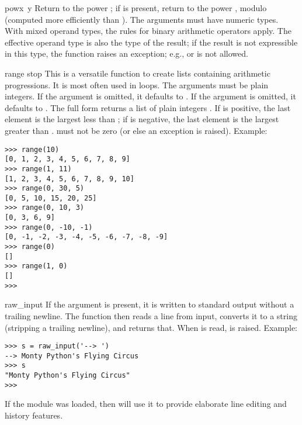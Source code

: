 \begin{funcdesc}{pow}{x\, y}
  Return  to the power ; if  is present, return
   to the power , modulo  (computed more
  efficiently than ).
  The arguments must have
  numeric types.  With mixed operand types, the rules for binary
  arithmetic operators apply.  The effective operand type is also the
  type of the result; if the result is not expressible in this type, the
  function raises an exception; e.g.,  or  is not allowed.
\end{funcdesc}

\begin{funcdesc}{range}{ stop}
  This is a versatile function to create lists containing arithmetic
  progressions.  It is most often used in  loops.  The
  arguments must be plain integers.  If the  argument is
  omitted, it defaults to .  If the  argument is
  omitted, it defaults to .  The full form returns a list of
  plain integers .  If  is positive,
  the last element is the largest  less than ; if  is negative, the last
  element is the largest 
  greater than .   must not be zero (or else an
  exception is raised).  Example:

\begin{verbatim}
>>> range(10)
[0, 1, 2, 3, 4, 5, 6, 7, 8, 9]
>>> range(1, 11)
[1, 2, 3, 4, 5, 6, 7, 8, 9, 10]
>>> range(0, 30, 5)
[0, 5, 10, 15, 20, 25]
>>> range(0, 10, 3)
[0, 3, 6, 9]
>>> range(0, -10, -1)
[0, -1, -2, -3, -4, -5, -6, -7, -8, -9]
>>> range(0)
[]
>>> range(1, 0)
[]
>>> 
\end{verbatim}
\end{funcdesc}

\begin{funcdesc}{raw_input}{}
  If the  argument is present, it is written to standard output
  without a trailing newline.  The function then reads a line from input,
  converts it to a string (stripping a trailing newline), and returns that.
  When \EOF{} is read,  is raised. Example:

\begin{verbatim}
>>> s = raw_input('--> ')
--> Monty Python's Flying Circus
>>> s
"Monty Python's Flying Circus"
>>> 
\end{verbatim}

If the  module was loaded, then
 will use it to provide elaborate
line editing and history features.
\end{funcdesc}

